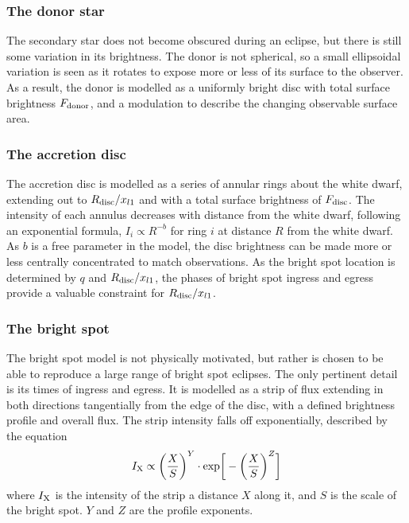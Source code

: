 \subsubsection{The donor star}

The secondary star does not become obscured during an eclipse, but there is still some variation in its brightness. The donor is not spherical, so a small ellipsoidal variation is seen as it rotates to expose more or less of its surface to the observer. As a result, the donor is modelled as a uniformly bright disc with total surface brightness $F_{\rm donor}$, and a modulation to describe the changing observable surface area.

\subsubsection{The accretion disc}

The accretion disc is modelled as a series of annular rings about the white dwarf, extending out to $R_{\rm disc} / x_{l1}$ and with a total surface brightness of $F_{\rm disc}$. The intensity of each annulus decreases with distance from the white dwarf, following an exponential formula, $I_i \propto R^{-b}$ for ring $i$ at distance $R$ from the white dwarf. As $b$ is a free parameter in the model, the disc brightness can be made more or less centrally concentrated to match observations. As the bright spot location is determined by $q$ and $R_{\rm disc} / x_{l1}$, the phases of bright spot ingress and egress provide a valuable constraint for $R_{\rm disc} / x_{l1}$.

\subsubsection{The bright spot}

The bright spot model is not physically motivated, but rather is chosen to be able to reproduce a large range of bright spot eclipses. The only pertinent detail is its times of ingress and egress.
It is modelled as a strip of flux extending in both directions tangentially from the edge of the disc, with a defined brightness profile and overall flux. The strip intensity falls off exponentially, described by the equation
\begin{equation}
    I_{\rm X} \propto \bigg ( \frac{X}{S} \bigg )^Y \cdot {\rm exp} \bigg [ - \bigg (\frac{X}{S} \bigg )^Z \bigg]
\end{equation}
where $I_{\rm X}$ is the intensity of the strip a distance $X$ along it, and $S$ is the scale of the bright spot. $Y$ and $Z$ are the profile exponents.

